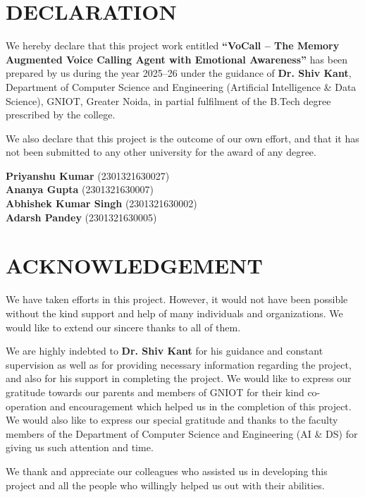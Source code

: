 \documentclass[12pt,a4paper]{article}
\begin{document}
\section*{DECLARATION}

We hereby declare that this project work entitled \textbf{``VoCall -- The Memory Augmented Voice Calling Agent with Emotional Awareness''} has been prepared by us during the year 2025--26 under the guidance of \textbf{Dr. Shiv Kant}, Department of Computer Science and Engineering (Artificial Intelligence \& Data Science), GNIOT, Greater Noida, in partial fulfilment of the B.Tech degree prescribed by the college.

We also declare that this project is the outcome of our own effort, and that it has not been submitted to any other university for the award of any degree.

\vspace{2.5cm}

\begin{flushright}
    \textbf{Priyanshu Kumar} (2301321630027)\\[0.2cm]
    \textbf{Ananya Gupta} (2301321630007)\\[0.2cm]
    \textbf{Abhishek Kumar Singh} (2301321630002)\\[0.2cm]
    \textbf{Adarsh Pandey} (2301321630005)
\end{flushright}

\newpage
\section*{ACKNOWLEDGEMENT}

We have taken efforts in this project. However, it would not have been possible without the kind support and help of many individuals and organizations. We would like to extend our sincere thanks to all of them.

We are highly indebted to \textbf{Dr. Shiv Kant} for his guidance and constant supervision as well as for providing necessary information regarding the project, and also for his support in completing the project. We would like to express our gratitude towards our parents and members of GNIOT for their kind co-operation and encouragement which helped us in the completion of this project. We would also like to express our special gratitude and thanks to the faculty members of the Department of Computer Science and Engineering (AI \& DS) for giving us such attention and time.

We thank and appreciate our colleagues who assisted us in developing this project and all the people who willingly helped us out with their abilities.
\end{document}
